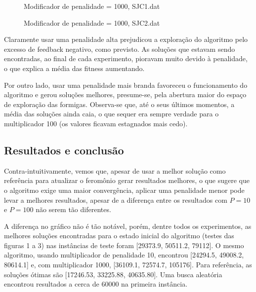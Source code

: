 \documentclass[11pt]{article}
\begin{document}
\begin{figure}[!ht]
	\centering
    \caption{Modificador de penalidade = 1000, SJC1.dat}
    \label{fig:data}
\end{figure}

\begin{figure}[!ht]
	\centering
    \caption{Modificador de penalidade = 1000, SJC2.dat}
    \label{fig:data}
\end{figure}

Claramente usar uma penalidade alta prejudicou a exploração do algoritmo pelo excesso de feedback negativo, como previsto. As soluções que estavam sendo encontradas, ao final de cada experimento, pioravam muito devido à penalidade, o que explica a média das fitness aumentando.

Por outro lado, usar uma penalidade mais branda favoreceu o funcionamento do algoritmo e gerou soluções melhores, presume-se, pela abertura maior do espaço de exploração das formigas. Observa-se que, até o seus últimos momentos, a média das soluções ainda caia, o que sequer era sempre verdade para o multiplicador 100 (os valores ficavam estagnados mais cedo).

\subsection{Resultados e conclusão}

Contra-intuitivamente, vemos que, apesar de usar a melhor solução como referência para atualizar o feromônio gerar resultados melhores, o que sugere que o algoritmo exige uma maior convergência, aplicar uma penalidade menor pode levar a melhores resultados, apesar de a diferença entre os resultados com $P = 10$ e $P = 100$ não serem tão diferentes.

A diferença no gráfico não é tão notável, porém, dentre todos os experimentos, as melhores soluções encontradas para o estado inicial do algoritmo (testes das figuras 1 a 3) nas instâncias de teste foram [29373.9, 50511.2, 79112]. O mesmo algoritmo, usando multiplicador de penalidade 10, encontrou [24294.5, 49008.2, 80614.1] e, com multiplicador 1000, [36109.1, 72574.7, 105176]. Para referência, as soluções ótimas são [17246.53, 33225.88, 40635.80]. Uma busca aleatória encontrou resultados a cerca de 60000 na primeira instância.
\end{document}
